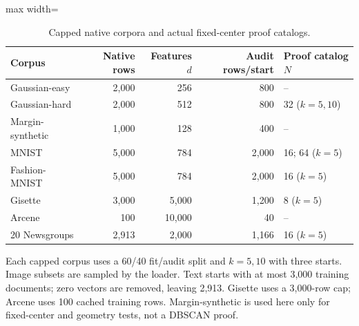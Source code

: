 \begin{table}[tp]
\caption{Capped native corpora and actual fixed-center proof catalogs.}\label{tab:datasets}
\centering\small
\begin{adjustbox}{max width=\textwidth}
\begin{tabular}{@{}lrrrl@{}}
\toprule
Corpus & Native rows & Features $d$ & Audit rows/start & Proof catalog $N$ \\
\midrule
Gaussian-easy & 2,000 & 256 & 800 & -- \\
Gaussian-hard & 2,000 & 512 & 800 & 32 ($k=5,10$) \\
Margin-synthetic & 1,000 & 128 & 400 & -- \\
MNIST & 5,000 & 784 & 2,000 & 16; 64 ($k=5$) \\
Fashion-MNIST & 5,000 & 784 & 2,000 & 16 ($k=5$) \\
Gisette & 3,000 & 5,000 & 1,200 & 8 ($k=5$) \\
Arcene & 100 & 10,000 & 40 & -- \\
20 Newsgroups & 2,913 & 2,000 & 1,166 & 16 ($k=5$) \\
\bottomrule
\end{tabular}
\end{adjustbox}
\par\vspace{3pt}\begin{minipage}{0.98\textwidth}\footnotesize Each capped corpus uses a 60/40 fit/audit split and $k=5,10$ with three starts. Image subsets are sampled by the loader. Text starts with at most 3,000 training documents; zero vectors are removed, leaving 2,913. Gisette uses a 3,000-row cap; Arcene uses 100 cached training rows. Margin-synthetic is used here only for fixed-center and geometry tests, not a DBSCAN proof.\end{minipage}
\end{table}
